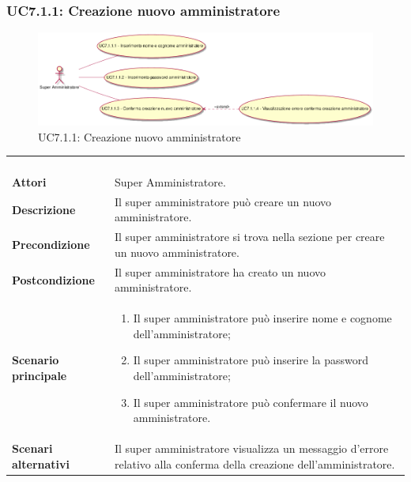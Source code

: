 \newpage\subsubsection{UC7.1.1: Creazione nuovo amministratore}
\label{UC7.1.1}
\begin{figure}[h]
\centering
\includegraphics[width=\textwidth,height=\textheight,keepaspectratio]{images/UseCaseUC711.png}
\caption{UC7.1.1: Creazione nuovo amministratore}
\end{figure}
\begin{longtable}{l|p{10cm}}
\rowcolor[gray]{0.8} \multicolumn{2}{c}{} \\
\rowcolor[gray]{0.8} \multicolumn{2}{c}{\textbf{UC7.1.1 - Creazione nuovo amministratore}} \\
\rowcolor[gray]{0.8} \multicolumn{2}{c}{} \\
\hline
&\\
\textbf{Attori} & Super Amministratore.\\[7pt]
\textbf{Descrizione} & Il super amministratore può creare un nuovo amministratore.\\[7pt]
\textbf{Precondizione} & Il super amministratore si trova nella sezione per creare un nuovo amministratore.\\[7pt]
\textbf{Postcondizione} & Il super amministratore ha creato un nuovo amministratore.\\[7pt]
\textbf{Scenario principale} &\begin{enumerate}
\item  Il super amministratore può inserire nome e cognome dell'amministratore;
\item  Il super amministratore può inserire la password dell'amministratore;
\item  Il super amministratore può confermare il nuovo amministratore.
\end{enumerate}
\\[7pt]
\textbf{Scenari alternativi} & Il super amministratore visualizza un messaggio d'errore relativo alla conferma della creazione dell'amministratore.\\[7pt]\hline
\end{longtable}

